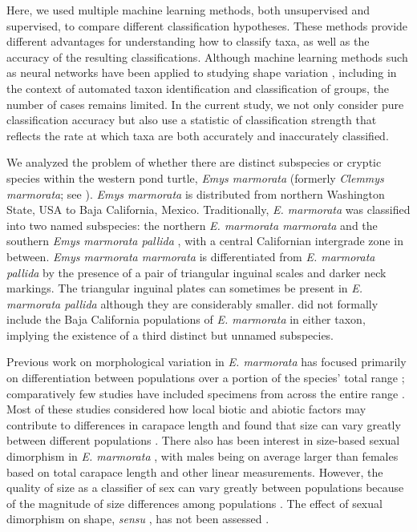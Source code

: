 \documentclass[12pt,letterpaper]{article}
\begin{document}
Here, we used multiple machine learning methods, both unsupervised and supervised, to compare different classification hypotheses. These methods provide different advantages for understanding how to classify taxa, as well as the accuracy of the resulting classifications. Although machine learning methods such as neural networks have been applied to studying shape variation \citep{Baylac2003,Dobigny2003,MacLeod2007,VandenBrink2011}, including in the context of automated taxon identification and classification of groups, the number of cases remains limited. In the current study, we not only consider pure classification accuracy but also use a statistic of classification strength that reflects the rate at which taxa are both accurately and inaccurately classified. 


We analyzed the problem of whether there are distinct subspecies or cryptic species within the western pond turtle, \textit{Emys marmorata} \citep{Baird1852} (formerly \emph{Clemmys marmorata}; see \citealp{Feldman2002}). \textit{Emys marmorata} is distributed from northern Washington State, USA to Baja California, Mexico. Traditionally, \textit{E. marmorata} was classified into two named subspecies: the northern \textit{E. marmorata marmorata} and the southern \textit{Emys marmorata pallida} \citep{Seeliger1945}, with a central Californian intergrade zone in between. \textit{Emys marmorata marmorata} is differentiated from \textit{E. marmorata pallida} by the presence of a pair of triangular inguinal scales and darker neck markings. The triangular inguinal plates can sometimes be present in \textit{E. marmorata pallida} although they are considerably smaller. \citet{Seeliger1945} did not formally include the Baja California populations of \textit{E. marmorata} in either taxon, implying the existence of a third distinct but unnamed subspecies.

Previous work on morphological variation in \textit{E. marmorata} has focused primarily on differentiation between populations over a portion of the species' total range \citep{Lubcke2007,Germano2008,Germano2009,Bury2010}; comparatively few studies have included specimens from across the entire range \citep{Holland1992}. Most of these studies considered how local biotic and abiotic factors may contribute to differences in carapace length and found that size can vary greatly between different populations \citep{Lubcke2007,Germano2008,Germano2009}. There also has been interest in size-based sexual dimorphism in \textit{E. marmorata} \citep{Holland1992,Lubcke2007,Germano2009}, with males being on average larger than females based on total carapace length and other linear measurements. However, the quality of size as a classifier of sex can vary greatly between populations \citep{Holland1992} because of the magnitude of size differences among populations \citep{Lubcke2007,Germano2009}. The effect of sexual dimorphism on shape, \textit{sensu} \citet{Kendall1977a}, has not been assessed \citep{Holland1992,Lubcke2007,Germano2008}.
\end{document}
